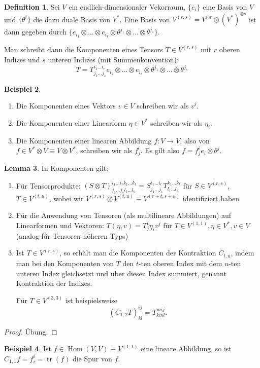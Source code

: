 \documentclass[a4paper]{scrreprt}
\numberwithin{equation}{chapter}
\DeclareMathOperator{\tr}{tr}
\DeclareMathOperator{\Hom}{Hom}
\theoremstyle{definition}
\newtheorem{defn}{Definition}[section]
\newtheorem{lemma}[defn]{Lemma}
\newtheorem{bsp}[defn]{Beispiel}
\newcommand{\bewUeb}{\begin{proof}Übung.\end{proof}}
\begin{document}
\begin{defn}
	Sei $V$ ein endlich-dimensionaler Vekorraum, $\{e_i\}$ eine Basis von $V$ und $\{\theta^i\}$ die dazu duale Basis von $V^*$. Eine Basis von $V^{(r,s)} = V^{\otimes r} \otimes (V^*)^{\otimes s}$ ist dann gegeben durch $\{e_{i_1} \otimes \dots \otimes e_{i_r} \otimes \theta^{j_1} \otimes \dots \otimes \theta^{j_s}\}$.

	Man schreibt dann die Komponenten eines Tensors $T \in V^{(r,s)}$ mit $r$ oberen Indizes und $s$ unteren Indizes (mit Summenkonvention):
	\[T = T^{i_1 \dots i_r}_{j_1 \dots j_s} e_{i_1} \otimes \dots \otimes e_{i_r} \otimes \theta^{j_1} \otimes \dots \otimes \theta^{j_s}\]
\end{defn}
\begin{bsp}
	\begin{enumerate}[label=(\alph*)]
		\item Die Komponenten eines Vektors $v\in V$ schreiben wir als $v^i$.
		\item Die Komponenten einer Linearform $\eta \in V^*$ schreiben wir als $\eta_i$.
		\item Die Komponenten einer linearen Abbildung $f\colon V \to V$, also von $f \in V^*\otimes V \equiv V \otimes V^*$, schreiben wir als $f^i_j$. Es gilt also $f = f^i_j e_i\otimes\theta^j$.
	\end{enumerate}
\end{bsp}
\begin{lemma}
	In Komponenten gilt:
	\begin{enumerate}[label=(\alph*)]
		\item Für Tensorprodukte: $(S\otimes T)^{i_1 \dots i_r k_1 \dots k_t}_{j_1 \dots j_s l_1 \dots l_u} = S^{i_1 \dots i_r}_{j_1 \dots j_s} T^{k_1 \dots k_t}_{l_1 \dots l_u}$ für $S \in V^{(r,s)}$, $T \in V^{(t,u)}$, wobei wir $V^{(r,s)} \otimes V^{(t,u)} \equiv V^{(r+t, s+u)}$ identifiziert haben
		\item Für die Anwendung von Tensoren (als multilineare Abbildungen) auf Linearformen und Vektoren: $T(\eta,v) = T^i_j \eta_i v^j$ für $T \in V^{(1,1)}, \eta \in V^*, v \in V$ (analog für Tensoren höheren Typs)
		\item Ist $T \in V^{(r,s)}$, so erhält man die Komponenten der Kontraktion $C_{t,u}$, indem man bei den Komponenten von $T$ den $t$-ten oberen Index mit dem $u$-ten unteren Index gleichsetzt und über diesen Index summiert, genannt \glqq Kontraktion der Indizes\grqq.

			Für $T \in V^{(3,3)}$ ist beispielsweise
			\[(C_{1,2}T)^{ij}_{kl} = T^{mij}_{kml}.\]
	\end{enumerate}
	\bewUeb
\end{lemma}
\begin{bsp}
	Ist $f \in \Hom(V,V) \equiv V^{(1,1)}$ eine lineare Abbildung, so ist $C_{1,1}f = f^i_i = \tr(f)$ die Spur von $f$.
\end{bsp}
\end{document}
